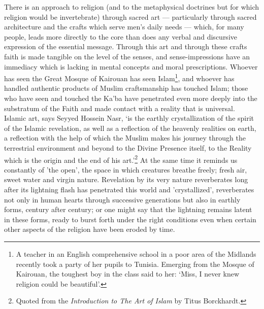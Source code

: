 \documentclass[10pt, twoside,openright]{book}
\begin{document}
There is an approach to religion (and to the metaphysical doctrines but for which religion would be 
invertebrate) through sacred art --- particularly through sacred architecture and the crafts which 
serve men's daily needs --- which, for many people, leads more directly to the core than does any 
verbal and discursive expression of the essential message. Through this art and through these crafts 
faith is made tangible on the level of the senses, and sense-impressions have an immediacy which is 
lacking in mental concepts and moral prescriptions. Whoever has seen the Great Mosque of Kairouan has 
seen Islam\footnote{A teacher in an English comprehensive school in a poor area of the Midlands recently took a party 
of her pupils to Tunisia. Emerging from the Mosque of Kairouan, the toughest boy in the class said to 
her: `Miss, I never knew religion could be beautiful'.}, and whoever has handled authentic products of Muslim craftsmanship has touched Islam; 
those who have seen and touched the Ka'ba have penetrated even more deeply into the substratum of the 
Faith and made contact with a reality that is universal. \\

Islamic art, says Seyyed Hossein Nasr, `is the earthly crystallization of the spirit of the Islamic 
revelation, as well as a reflection of the heavenly realities on earth, a reflection with the help of 
which the Muslim makes his journey through the terrestrial environment and beyond to the Divine 
Presence itself, to the Reality which is the origin and the end of his art.'\footnote{Quoted from the \emph{Introduction to The Art of Islam} by Titus Borckhardt.} At the same time it 
reminds us constantly of 'the open', the space in which creatures breathe freely; fresh air, sweet 
water and virgin nature. Revelation by its very nature reverberates long after its lightning flash 
has penetrated this world and 'crystallized', reverberates not only in human hearts through 
successive generations but also in earthly forms, century after century; or one might say that the 
lightning remains latent in these forms, ready to burst forth under the right conditions even when 
certain other aspects of the religion have been eroded by time. \\
\end{document}
